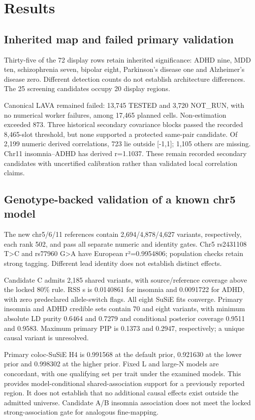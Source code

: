 \documentclass[11pt]{article}
\begin{document}
\section*{Results}
\subsection*{Inherited map and failed primary validation}
Thirty-five of the 72 display rows retain inherited significance: ADHD nine, MDD ten, schizophrenia seven, bipolar eight, Parkinson's disease one and Alzheimer's disease zero. Different detection counts do not establish architecture differences. The 25 screening candidates occupy 20 display regions.

Canonical LAVA remained failed: 13,745 TESTED and 3,720 NOT\_RUN, with no numerical worker failures, among 17,465 planned cells. Non-estimation exceeded 873. Three historical secondary covariance blocks passed the recorded 8,465-slot threshold, but none supported a protected same-pair candidate. Of 2,199 numeric derived correlations, 723 lie outside [-1,1]; 1,105 others are missing. Chr11 insomnia--ADHD has derived r=1.1037. These remain recorded secondary candidates with uncertified calibration rather than validated local correlation claims.

\subsection*{Genotype-backed validation of a known chr5 model}
The new chr5/6/11 references contain 2,694/4,878/4,627 variants, respectively, each rank 502, and pass all separate numeric and identity gates. Chr5 rs2431108 T>C and rs77960 G>A have European r²=0.9954806; population checks retain strong tagging. Different lead identity does not establish distinct effects.

Candidate C admits 2,185 shared variants, with source/reference coverage above the locked 80\% rule. RSS s is 0.0140861 for insomnia and 0.0091722 for ADHD, with zero predeclared allele-switch flags. All eight SuSiE fits converge. Primary insomnia and ADHD credible sets contain 70 and eight variants, with minimum absolute LD purity 0.6464 and 0.7279 and conditional posterior coverage 0.9511 and 0.9583. Maximum primary PIP is 0.1373 and 0.2947, respectively; a unique causal variant is unresolved.

Primary coloc-SuSiE H4 is 0.991568 at the default prior, 0.921630 at the lower prior and 0.998302 at the higher prior. Fixed L and large-N models are concordant, with one qualifying set per trait under the examined models. This provides model-conditional shared-association support for a previously reported region. It does not establish that no additional causal effects exist outside the admitted universe. Candidate A/B insomnia association does not meet the locked strong-association gate for analogous fine-mapping.
\end{document}
